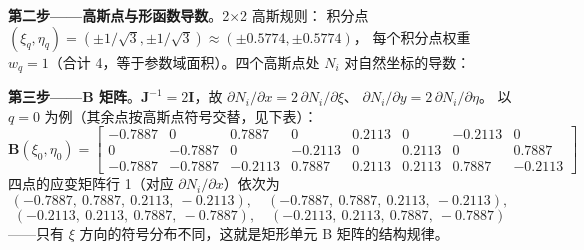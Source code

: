 \documentclass[12pt,a4paper]{ctexart}
\begin{document}
\textbf{第二步——高斯点与形函数导数}。2$\times$2 高斯规则：
积分点 $(\xi_q,\eta_q) \allowbreak = (\pm 1/\sqrt{3}, \pm 1/\sqrt{3}) \allowbreak
\approx (\pm 0.5774, \pm 0.5774)$，
每个积分点权重 $w_q = 1$（合计 4，等于参数域面积）。四个高斯点处
$N_i$ 对自然坐标的导数：

\begin{center}\small
{}
\end{center}

\textbf{第三步——B 矩阵}。$\mathbf{J}^{-1} = 2\mathbf{I}$，故
$\partial N_i/\partial x = 2\,\partial N_i/\partial\xi$、
$\partial N_i/\partial y = 2\,\partial N_i/\partial\eta$。
以 $q=0$ 为例（其余点按高斯点符号交替，见下表）：
\begin{equation}
\mathbf{B}(\xi_0,\eta_0) = \begin{bmatrix}
-0.7887 & 0 & 0.7887 & 0 & 0.2113 & 0 & -0.2113 & 0 \\
0 & -0.7887 & 0 & -0.2113 & 0 & 0.2113 & 0 & 0.7887 \\
-0.7887 & -0.7887 & -0.2113 & 0.7887 & 0.2113 & 0.2113 & 0.7887 & -0.2113
\end{bmatrix}
\end{equation}
四点的应变矩阵行 1（对应 $\partial N_i/\partial x$）依次为
\begin{equation*}
(-0.7887,\ 0.7887,\ 0.2113,\ -0.2113),\quad
(-0.7887,\ 0.7887,\ 0.2113,\ -0.2113),
\end{equation*}
\begin{equation*}
(-0.2113,\ 0.2113,\ 0.7887,\ -0.7887),\quad
(-0.2113,\ 0.2113,\ 0.7887,\ -0.7887)
\end{equation*}
——只有 $\xi$ 方向的符号分布不同，这就是矩形单元 B 矩阵的结构规律。
\end{document}
